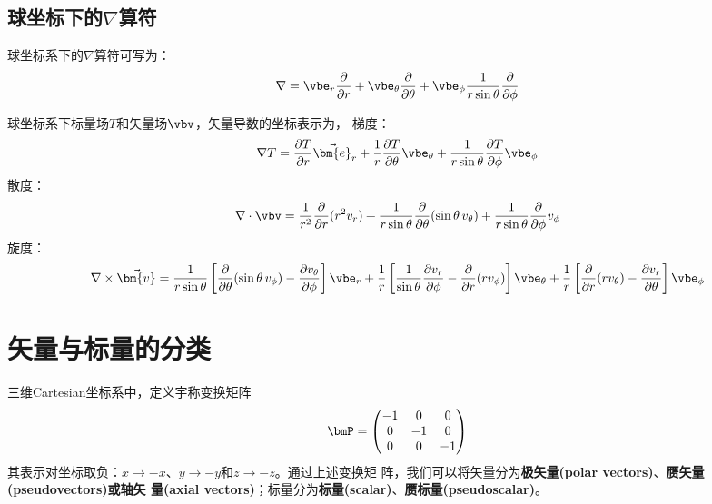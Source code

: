 \subsection{球坐标下的\texorpdfstring{$\nabla$}{}算符}
球坐标系下的$\nabla$算符可写为：
\begin{equation}
    \nabla =  \vbe_r \frac{\partial}{\partial r} 
            + \vbe_\theta \frac{\partial}{\partial \theta}
            + \vbe_\phi \frac{1}{r\sin{\theta}} \frac{\partial}{\partial \phi}
    \label{eq:nabla-sphere-form}
\end{equation}

球坐标系下标量场$T$和矢量场$\vbv$，矢量导数的坐标表示为，\newline
梯度：
\begin{equation}
    \nabla T = \frac{\partial T}{\partial r} \vec{\bm{e}}_r
              +\frac{1}{r} \frac{\partial T}{\partial \theta} \vbe_{\theta}
              +\frac{1}{r\sin{\theta}}\frac{\partial T}{\partial \phi} \vbe_{\phi}
    \label{eq:sphere-gradient}
\end{equation}
散度：
\begin{equation}
    \nabla \cdot \vbv = \frac{1}{r^2} \frac{\partial}{\partial r}(r^2 v_r)
      + \frac{1}{r\sin{\theta}}\frac{\partial}{\partial\theta}(\sin{\theta}\, v_{\theta})
      + \frac{1}{r\sin{\theta}}\frac{\partial}{\partial\phi} v_{\phi}
    \label{eq:sphere-divergence}
\end{equation}
旋度：
\begin{equation}
    \nabla \times \vec{\bm{v}} =
    \frac{1}{r\sin{\theta}}\left[ \frac{\partial}{\partial\theta}(\sin{\theta}\,v_{\phi}) 
                      - \frac{\partial v_{\theta}}{\partial\phi}\right] \vbe_r
     +\frac{1}{r} \left[ \frac{1}{\sin{\theta}} \frac{\partial v_{r}}{\partial \phi} 
                 - \frac{\partial}{\partial r}(r v_{\phi})\right] \vbe_{\theta}
     +\frac{1}{r}\left[\frac{\partial}{\partial r}(r v_{\theta})
                 - \frac{\partial v_{r}}{{\partial \theta}} \right] \vbe_{\phi}
    \label{eq:sphere-curl}
\end{equation}

\section{矢量与标量的分类}
三维Cartesian坐标系中，定义宇称变换矩阵
\begin{equation}
    \bmP = \begin{pmatrix}
        -1  &   0   &   0   \\
         0  &  -1   &   0   \\
         0  &   0   &  -1 
    \end{pmatrix}
    \label{eq:inverse-matrix}
\end{equation}
其表示对坐标取负：$x\rightarrow -x$、$y\rightarrow -y$和$z\rightarrow -z$。通过上述变换矩
阵，我们可以将矢量分为\textbf{极矢量(polar vectors)}、\textbf{赝矢量(pseudovectors)或轴矢
量(axial vectors)}；标量分为\textbf{标量(scalar)}、\textbf{赝标量(pseudoscalar)}。

